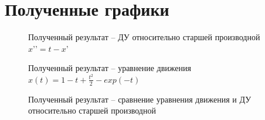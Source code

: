 \documentclass[12pt]{article}
\begin{document}
	\newpage 
	\clearpage
	\section{Полученные графики}
	\begin{figure}[h]
		\caption{Полученный результат -- ДУ относительно старшей производной $x’’=t-x’$}
	\end{figure}

	\begin{figure}[h]
		\caption{Полученный результат --  уравнение движения $x(t)=1-t+\frac{t^{2}}{2}-exp(-t)$}
	\end{figure}


	\begin{figure}[h]
		\caption{Полученный результат --  сравнение уравнения движения и ДУ относительно старшей производной}
	\end{figure}
\end{document}

